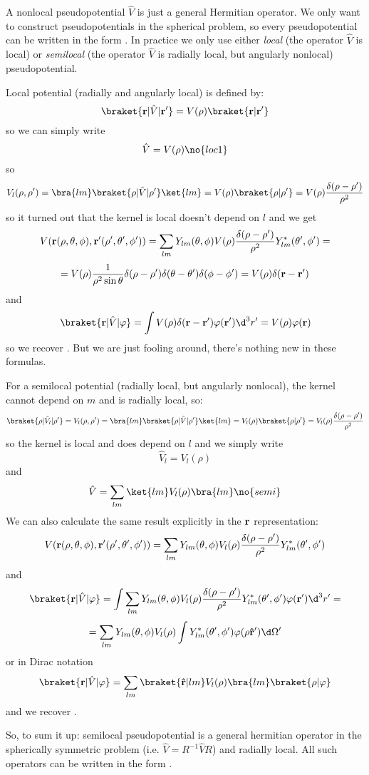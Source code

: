 A nonlocal pseudopotential $\hat V$ is just a general Hermitian operator.
We only want to construct pseudopotentials in the spherical problem, so every
pseudopotential can be written in the form .
In practice we only use either {\it local\/} (the operator $\hat V$ is local)
or {\it semilocal\/} (the operator $\hat V$ is radially local, but angularly
nonlocal) pseudopotential.

Local potential (radially and angularly local) is defined by:
$$\braket{{\bf r}|\hat V|{\bf r'}}=V(\rho)\braket{{\bf r}|{\bf r'}}$$
so we can simply write
$$\hat V=V(\rho)\no{loc1}$$
so
$$V_l(\rho,\rho')
=\bra{lm}\braket{\rho|\hat V|\rho'}\ket{lm}
=V(\rho)\braket{\rho|\rho'}
=V(\rho){\delta(\rho-\rho')\over\rho^2}$$
so it turned out that the kernel is local doesn't depend on $l$ and we get
$$V({\bf r}(\rho,\theta,\phi), {\bf r'}(\rho',\theta',\phi'))=
\sum_{lm}Y_{lm}(\theta,\phi) V(\rho){\delta(\rho-\rho')\over\rho^2} Y_{lm}^*(\theta',\phi')=
$$
$$
=V(\rho){1\over\rho^2\sin\theta}
\delta(\rho-\rho')\delta(\theta-\theta')\delta(\phi-\phi')=
V(\rho)\delta({\bf r}-{\bf r}')$$
and
$$\braket{{\bf r}|\hat V|\varphi}=\int 
V(\rho)\delta({\bf r}-{\bf r}')
\varphi({\bf r'})\d^3r'=V(\rho)\varphi({\bf r})$$
so we recover . But we are just fooling around, there's nothing new in these formulas.

For a semilocal potential (radially local, but angularly nonlocal), the kernel
cannot depend on $m$ and is radially local, so:
$$\braket{\rho|\hat V_l|\rho'}=V_l(\rho,\rho')
=\bra{lm}\braket{\rho|\hat V|\rho'}\ket{lm}
=V_l(\rho)\braket{\rho|\rho'}
=V_l(\rho){\delta(\rho-\rho')\over\rho^2}$$
so the kernel is local and does depend on $l$ and we simply write
$$\hat V_l=V_l(\rho)$$
and
$$\hat V=\sum_{lm} \ket{lm}V_l(\rho)\bra{lm}\no{semi}$$
We can also calculate the same result explicitly in the $\bf r$
representation:
$$V({\bf r}(\rho,\theta,\phi), {\bf r'}(\rho',\theta',\phi'))=
\sum_{lm}Y_{lm}(\theta,\phi) V_l(\rho){\delta(\rho-\rho')\over\rho^2} Y_{lm}^*(\theta',\phi')
$$
and
$$\braket{{\bf r}|\hat V|\varphi}=\int 
\sum_{lm}Y_{lm}(\theta,\phi) V_l(\rho){\delta(\rho-\rho')\over\rho^2} Y_{lm}^*(\theta',\phi')
\varphi({\bf r'})\d^3r'=$$
$$=
\sum_{lm}Y_{lm}(\theta,\phi) V_l(\rho) \int Y_{lm}^*(\theta',\phi')
\varphi(\rho{\bf\hat r'})\d\Omega'
$$
or in Dirac notation
$$\braket{{\bf r}|\hat V|\varphi}=
\sum_{lm} \braket{{\bf\hat r}|lm}V_l(\rho) \bra{lm}\braket{\rho|\varphi}
$$
and we recover .

So, to sum it up: semilocal pseudopotential is a general hermitian operator
in the spherically symmetric problem (i.e. $\hat V=R^{-1}\hat VR$) and radially
local. All such operators can be written in the form .

